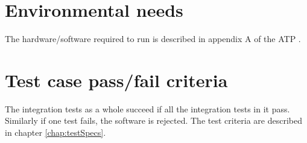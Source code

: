 \section{Environmental needs}
The hardware/software required to run \applicationname{} is described in appendix A of the ATP \cite{atp}.

\section{Test case pass/fail criteria}
The integration tests as a whole succeed if all the integration tests in it pass. Similarly if one test fails, the software is rejected.
The test criteria are described in chapter \ref{chap:testSpecs}.
